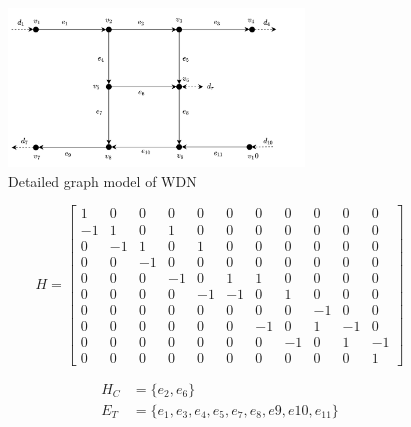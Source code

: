\begin{figure}[h]
	\centering
	\includegraphics[width=0.7\textwidth]{Pictures/GraphDetailed.png}
	\caption{Detailed graph model of WDN} 
		\label{fig:WDNDetailed}
	\end{figure}
	
	\begin{equation}
		H = \begin{bmatrix}
			1 & 0 & 0   & 0  & 0  & 0  & 0  & 0  & 0  & 0  & 0 \\
			-1 & 1 & 0  & 1  & 0  & 0  & 0  & 0  & 0  & 0  & 0 \\
			0 & -1 & 1  & 0  & 1  & 0  & 0  & 0  & 0  & 0  & 0 \\
			0 & 0  & -1 & 0  & 0  & 0  & 0  & 0  & 0  & 0  & 0 \\
			0 & 0  & 0  & -1 & 0  & 1  & 1  & 0  & 0  & 0  & 0 \\
			0 & 0  & 0  & 0  & -1 & -1 & 0  & 1  & 0  & 0  & 0 \\
			0 & 0  & 0  & 0  & 0  & 0  & 0  & 0  & -1 & 0  & 0 \\
			0 & 0  & 0  & 0  & 0  & 0  & -1 & 0  & 1  & -1 & 0 \\
			0 & 0  & 0  & 0  & 0  & 0  & 0  & -1 & 0  & 1  & -1 \\
			0 & 0  & 0  & 0  & 0  & 0  & 0  & 0  & 0  & 0  & 1 
		\end{bmatrix}
	\end{equation}	
	
\begin{equation*} 
	\begin{split}
		H_{C} &= \{e_{2},e_{6}\}   \\ E_{T} &= \{e_1,e_3,e_4,e_5,e_7, e_8, e9, e10 , e_11\}
	\end{split}
\end{equation*}	
	
